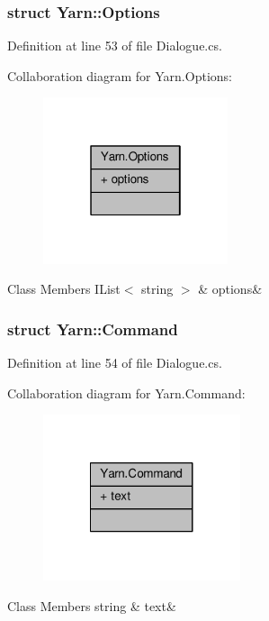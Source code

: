 \subsubsection{struct Yarn\-:\-:Options}


Definition at line 53 of file Dialogue.\-cs.



Collaboration diagram for Yarn.\-Options\-:
\nopagebreak
\begin{figure}[H]
\begin{center}
\leavevmode
\includegraphics[width=154pt]{a00373}
\end{center}
\end{figure}
\begin{DoxyFields}{Class Members}
\hypertarget{a00041_ae8c616d923ceeeed192a9436c55d9917}{I\-List$<$ string $>$}\label{a00041_ae8c616d923ceeeed192a9436c55d9917}
&
options&
\\
\hline

\end{DoxyFields}
\label{a00355}
\hypertarget{a00041_a00355}{}
\subsubsection{struct Yarn\-:\-:Command}


Definition at line 54 of file Dialogue.\-cs.



Collaboration diagram for Yarn.\-Command\-:
\nopagebreak
\begin{figure}[H]
\begin{center}
\leavevmode
\includegraphics[width=164pt]{a00374}
\end{center}
\end{figure}
\begin{DoxyFields}{Class Members}
\hypertarget{a00041_a8564e5104566e145f5d917ec846444d9}{string}\label{a00041_a8564e5104566e145f5d917ec846444d9}
&
text&
\\
\hline

\end{DoxyFields}
